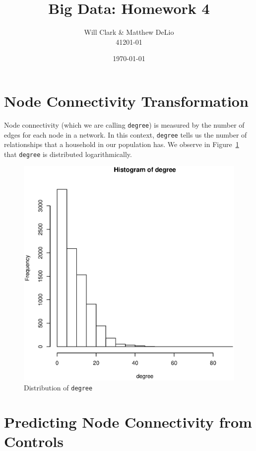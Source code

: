 \documentclass[11pt, fleqn]{article}
\begin{document}
\title{Big Data: Homework 4}
\author{Will Clark \& Matthew DeLio \\ 41201-01}
\date{\today}
\maketitle

\section{Node Connectivity Transformation}

Node connectivity (which we are calling \texttt{degree}) is measured by the number of edges for each node in a network. In this context, \texttt{degree} tells us the number of relationships that a household in our population has. We observe in Figure~\ref{fig:degrees} that \texttt{degree} is distributed logarithmically.

\begin{figure}[!htb]
  \centering
  \includegraphics[scale=.5]{degrees.eps}
  \caption{Distribution of \texttt{degree}}
  \label{fig:degrees}
\end{figure}

\section{Predicting Node Connectivity from Controls}
\label{sec:predict}
\end{document}
